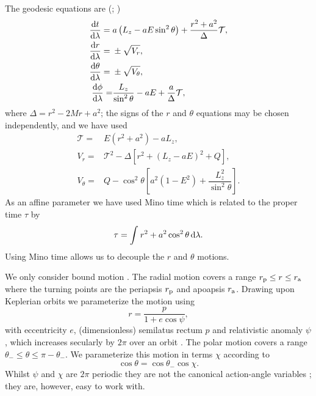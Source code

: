The geodesic equations are (\citealt{Carter1968}; \citealt[section 62]{Chandrasekhar1992})
\begin{subequations}
\begin{align}
\dfrac{\mathrm{d} {t}}{\mathrm{d} {\lambda}} = {} & a\left(L_z - aE\sin^2 \theta\right) + \dfrac{r^2 + a^2}{\Delta}\mathcal{T},\\
\dfrac{\mathrm{d} {r}}{\mathrm{d} {\lambda}} = {} & \pm \sqrt{V_r},\\
\dfrac{\mathrm{d} {\theta}}{\mathrm{d} {\lambda}} = {} & \pm \sqrt{V_\theta},\\
\dfrac{\mathrm{d} {\phi}}{\mathrm{d} {\lambda}}  = & \dfrac{L_z}{\sin^2 \theta} - aE + \dfrac{a}{\Delta}\mathcal{T},
\end{align}
\end{subequations}
where $\Delta = r^2 - 2M r + a^2$; the signs of the $r$ and $\theta$ equations may be chosen independently, and we have used
\begin{subequations}
\begin{align}
\mathcal{T} = {} & E\left(r^2 +a^2\right) - aL_z,\\
V_r = {} & \mathcal{T}^2 - \Delta\left[r^2 + \left(L_z -aE\right)^2 + Q\right],\\
V_\theta = {} & Q - \cos^2 \theta\left[a^2\left(1 - E^2\right) + \dfrac{L_z^2}{\sin^2\theta}\right].
\end{align}
\end{subequations}
As an affine parameter we have used Mino time which is related to the proper time $\tau$ by \citep{Mino2003}
\begin{equation}
\tau = \int_{}^{}{r^2 + a^2 \cos^2\theta}\,\mathrm{d}{\lambda}.
\end{equation}
Using Mino time allows us to decouple the $r$ and $\theta$ motions.

We only consider bound motion \citep{Wilkins1972}. The radial motion covers a range $r_\mathrm{p} \leq r \leq r_\mathrm{a}$ where the turning points are the periapsis $r_\mathrm{p}$ and apoapsis $r_\mathrm{a}$. Drawing upon Keplerian orbits we parameterize the motion using
\begin{equation}
r = \dfrac{p}{1+e\cos\psi},
\end{equation}
with eccentricity $e$, (dimensionless) semilatus rectum $p$ and relativistic anomaly $\psi$, which increases secularly by $2\pi$ over an orbit  \citep{Darwin1961,Drasco2004}. The polar motion covers a range $\theta_- \leq \theta \leq \pi - \theta_-$. We parameterize this motion in terms $\chi$ according to \citep{Hughes2000}
\begin{equation}
\cos\theta = \cos\theta_-\cos\chi.
\end{equation}
Whilst $\psi$ and $\chi$ are $2\pi$ periodic they are not the canonical action-angle variables \citep{Schmidt2002}; they are, however, easy to work with.

